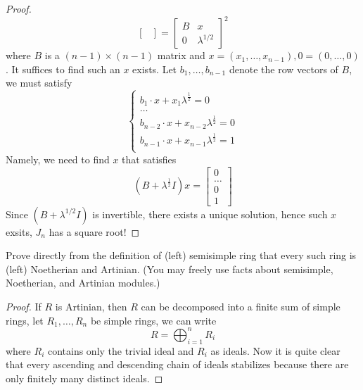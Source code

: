 \documentclass[openany]{book}
\begin{document}
\begin{proof}
\begin{equation*}
\begin{bmatrix}
            \end{bmatrix}=\begin{bmatrix}
                B&x\\
                0&\lambda^{1/2}
            \end{bmatrix}^2
        \end{equation*}
        where $B$ is a $(n-1)\times (n-1)$ matrix and $x=(x_1,\dots,x_{n-1}), 0=(0,\dots,0)$. It suffices to find such an $x$ exists. Let $b_1,\dots,b_{n-1}$ denote the row vectors of $B$, we must satisfy 
        \begin{equation*}
            \begin{cases}
                b_1\cdot x+x_1\lambda^\frac{1}{2}=0\\
                \dots\\
                b_{n-2}\cdot x+x_{n-2}\lambda^\frac{1}{2}=0\\
                b_{n-1}\cdot x+x_{n-1}\lambda^\frac{1}{2}=1\\
            \end{cases}
        \end{equation*}
        Namely, we need to find $x$ that satisfies 
        \begin{equation*}
            (B+\lambda^\frac{1}{2}I)x=\begin{bmatrix}
                0\\
                \dots\\
                0\\
                1
            \end{bmatrix}
        \end{equation*}
        Since $(B+\lambda^{1/2}I)$ is invertible, there exists a unique solution, hence such $x$ exsits, $J_n$ has a square root!
\end{proof}



\begin{prob}
    Prove directly from the definition of (left) semisimple ring that every such ring is (left) Noetherian and Artinian. (You may freely use facts about semisimple, Noetherian, and Artinian modules.)
\end{prob}
\begin{proof}
    If $R$ is Artinian, then $R$ can be decomposed into a finite sum of simple rings, let $R_1,\dots, R_n$ be simple rings, we can write 
    \begin{equation*}
        R=\bigoplus_{i=1}^nR_i
    \end{equation*}
    where $R_i$ contains only the trivial ideal and $R_i$ as ideals. Now it is quite clear that every ascending and descending chain of ideals stabilizes because there are only finitely many distinct ideals. 
\end{proof}
\end{document}
